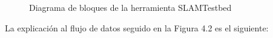 \begin{figure}
\begin{center}
\hspace{0.5cm}
\end{center}
\caption{ Diagrama de bloques de la herramienta SLAMTestbed }
\end{figure}

La explicación al flujo de datos seguido en la Figura 4.2 es el siguiente:


